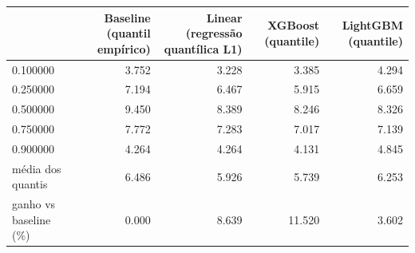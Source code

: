 \begin{tabular}{lrrrr}
\toprule
 & Baseline (quantil empírico) & Linear (regressão quantílica L1) & XGBoost (quantile) & LightGBM (quantile) \\
\midrule
0.100000 & 3.752 & 3.228 & 3.385 & 4.294 \\
0.250000 & 7.194 & 6.467 & 5.915 & 6.659 \\
0.500000 & 9.450 & 8.389 & 8.246 & 8.326 \\
0.750000 & 7.772 & 7.283 & 7.017 & 7.139 \\
0.900000 & 4.264 & 4.264 & 4.131 & 4.845 \\
média dos quantis & 6.486 & 5.926 & 5.739 & 6.253 \\
ganho vs baseline (\%) & 0.000 & 8.639 & 11.520 & 3.602 \\
\bottomrule
\end{tabular}
